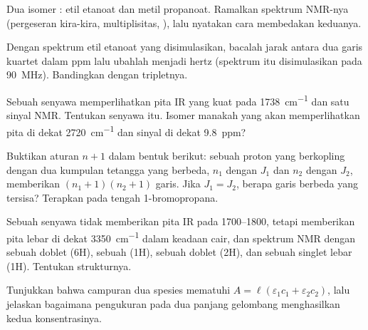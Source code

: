 \begin{exercise}[$\star\star$]\label{exo:b1:structure-spectroscopy:7}
Dua isomer : etil etanoat dan metil propanoat. Ramalkan
spektrum NMR-nya (pergeseran kira-kira, multiplisitas, ), lalu
nyatakan cara membedakan keduanya.
\end{exercise}

\begin{exercise}[$\star\star$]\label{exo:b1:structure-spectroscopy:8}
Dengan spektrum etil etanoat yang disimulasikan, bacalah jarak antara
dua garis kuartet dalam ppm lalu ubahlah menjadi hertz (spektrum itu
disimulasikan pada \qty{90}{MHz}). Bandingkan dengan tripletnya.
\end{exercise}

\begin{exercise}[$\star\star$]\label{exo:b1:structure-spectroscopy:9}
Sebuah senyawa  memperlihatkan pita IR yang kuat pada
\qty{1738}{cm^{-1}} dan satu sinyal NMR. Tentukan senyawa itu. Isomer
manakah yang akan memperlihatkan pita di dekat \qty{2720}{cm^{-1}} dan
sinyal di dekat \qty{9.8}{ppm}?
\end{exercise}

\begin{exercise}[$\star\star\star$]\label{exo:b1:structure-spectroscopy:10}
Buktikan aturan $n + 1$ dalam bentuk berikut: sebuah proton yang
berkopling dengan dua kumpulan tetangga yang berbeda, $n_1$ dengan $J_1$
dan $n_2$ dengan $J_2$, memberikan $(n_1 +
1)(n_2 + 1)$ garis. Jika $J_1 = J_2$, berapa garis berbeda yang tersisa?
Terapkan pada  tengah 1-bromopropana.
\end{exercise}

\begin{exercise}[$\star\star\star$]\label{exo:b1:structure-spectroscopy:11}
Sebuah senyawa  tidak memberikan pita IR pada 1700--1800,
tetapi memberikan pita lebar di dekat \qty{3350}{cm^{-1}} dalam keadaan
cair, dan spektrum NMR dengan sebuah doblet (6H), sebuah  (1H),
sebuah doblet (2H), dan sebuah singlet lebar (1H). Tentukan strukturnya.
\end{exercise}

\begin{exercise}[$\star\star\star$]\label{exo:b1:structure-spectroscopy:12}
Tunjukkan bahwa  campuran dua spesies mematuhi $A = \ell(\varepsilon_1c_1
+ \varepsilon_2c_2)$, lalu jelaskan bagaimana pengukuran pada dua panjang
gelombang menghasilkan kedua konsentrasinya.
\end{exercise}

